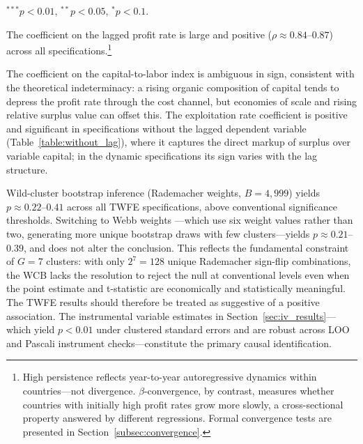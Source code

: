 \documentclass[10pt]{article}
\begin{document}
\begin{table}[!htbp]
\begin{minipage}[t]{\textwidth}
  $^{***}p<0.01$, $^{**}p<0.05$, $^{*}p<0.1$.
  \end{minipage}
\end{table}

\par The coefficient on the lagged profit rate is large and positive ($\rho \approx 0.84$--$0.87$) across all specifications.\footnote{High persistence reflects year-to-year autoregressive dynamics within countries---not divergence. $\beta$-convergence, by contrast, measures whether countries with initially high profit rates grow more slowly, a cross-sectional property answered by different regressions. Formal convergence tests are presented in Section~\ref{subsec:convergence}.}

\par The coefficient on the capital-to-labor index is ambiguous in sign, consistent with the theoretical indeterminacy: a rising organic composition of capital tends to depress the profit rate through the cost channel, but economies of scale and rising relative surplus value can offset this. The exploitation rate coefficient is positive and significant in specifications without the lagged dependent variable (Table~\ref{table:without_lag}), where it captures the direct markup of surplus over variable capital; in the dynamic specifications its sign varies with the lag structure.

\par Wild-cluster bootstrap inference \citep{cameronmillerguide2015} (Rademacher weights, $B=4{,}999$) yields $p \approx 0.22$--$0.41$ across all TWFE specifications, above conventional significance thresholds. Switching to Webb weights \citep{mackinnon2015wild}---which use six weight values rather than two, generating more unique bootstrap draws with few clusters---yields $p \approx 0.21$--$0.39$, and does not alter the conclusion. This reflects the fundamental constraint of $G=7$ clusters: with only $2^7=128$ unique Rademacher sign-flip combinations, the WCB lacks the resolution to reject the null at conventional levels even when the point estimate and t-statistic are economically and statistically meaningful. The TWFE results should therefore be treated as suggestive of a positive association. The instrumental variable estimates in Section~\ref{sec:iv_results}---which yield $p<0.01$ under clustered standard errors and are robust across LOO and Pascali instrument checks---constitute the primary causal identification.
\end{document}
